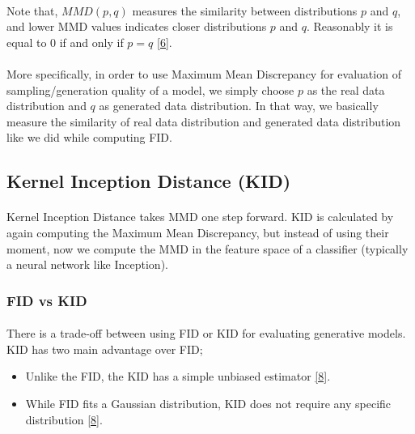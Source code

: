 \documentclass{article}
\begin{document}
    \paragraph{}
    Note that, $MMD(p, q)$ measures the similarity between distributions $p$ and $q$, and lower MMD values indicates closer distributions $p$ and $q$. Reasonably it is equal to 0 if and only if $p = q$ \hyperref[sec: ref6]{[6]}.

    \paragraph{}
    More specifically, in order to use Maximum Mean Discrepancy for evaluation of sampling/generation quality of a model, we simply choose $p$ as the real data distribution and $q$ as generated data distribution. In that way, we basically measure the similarity of real data distribution and generated data distribution like we did while computing FID.

    \subsection{Kernel Inception Distance (KID)}
    \paragraph{}
    Kernel Inception Distance takes MMD one step forward. KID is calculated by again computing the Maximum Mean Discrepancy, but instead of using their moment, now we compute the MMD in the feature space of a classifier (typically a neural network like Inception).
        \subsubsection{FID vs KID}
        \paragraph{}
        There is a trade-off between using FID or KID for evaluating generative models. KID has two main advantage over FID;
        \begin{itemize}
            \item Unlike the FID, the KID has a simple unbiased estimator \hyperref[sec: ref8]{[8]}.
            \item While FID fits a Gaussian distribution, KID does not require any specific distribution \hyperref[sec: ref8]{[8]}.
        \end{itemize}
\end{document}

